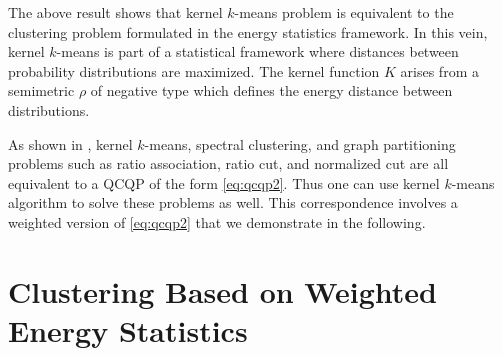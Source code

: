 \documentclass[aps,preprint,nofootinbib,floatfix]{revtex4-1}
\newcommand\kk{K}
\begin{document}
The above result shows that 
kernel $k$-means problem is equivalent to the clustering problem
formulated in the energy statistics framework.
In this vein, kernel $k$-means is part of a
statistical framework where distances between probability
distributions are maximized. 
The kernel function $\kk$ arises from a semimetric $\rho$ of
negative type which defines the energy distance between distributions.

As shown in \cite{Dhillon2,Dhillon}, kernel $k$-means, spectral clustering,
and graph partitioning problems such as ratio association, ratio cut, and
normalized cut are all equivalent to a QCQP of the form \eqref{eq:qcqp2}. Thus
one can use kernel $k$-means algorithm to solve these problems as well.
This correspondence involves a weighted version of \eqref{eq:qcqp2} that
we demonstrate in the following.


\section{Clustering Based on Weighted Energy Statistics}
\label{sec:weighted}
\end{document}
